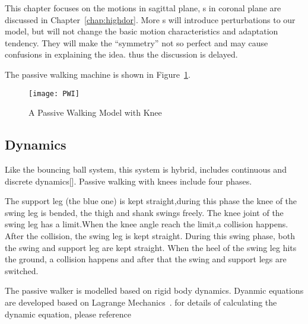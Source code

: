 This chapter focuses on the motions in sagittal plane,  \dof s in coronal plane are discussed in Chapter~\ref{chap:highdor}.
More \dof s will introduce perturbations to our model, but will not change the basic motion characteristics and adaptation tendency.
They will make the ``symmetry'' not so perfect and may cause confusions in explaining the idea. thus the discussion is delayed.


The passive walking machine is shown in Figure~\ref{fig:passivekneewalker}.

\begin{figure}[!htbp]
  \begin{center}
    \texttt{[image: PWI]}
    \caption{A Passive Walking Model with Knee}
    \label{fig:passivekneewalker}
  \end{center}
\end{figure}



\subsection*{Dynamics}

Like the bouncing ball system, this system is hybrid\citep{ames2006categorical}, includes continuous and discrete dynamics[].
Passive walking with knees include four phases\citep{Chen2007}.
\begin{itemize}
The support leg (the blue one) is kept straight,during this phase the knee of the swing leg is bended, the thigh and shank swings freely.
The knee joint of the swing leg has a limit.When the knee angle reach the limit,a collision happens.
After the collision, the swing leg is kept straight.
During this swing phase, both the swing and support leg are kept straight.
When the heel of the swing leg hits the ground, a collision happens and after that the swing and support legs are switched.
\end{itemize}


The passive walker is modelled based on rigid body dynamics.
Dyanmic equations are developed based on Lagrange Mechanics~\citep{Goldstein2002}.
for details of calculating the dynamic equation, please reference\citep{Chen2007}



